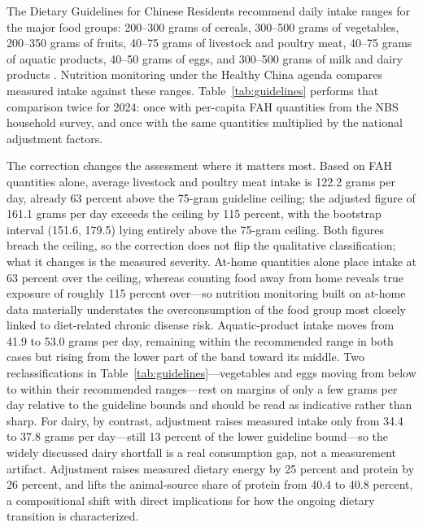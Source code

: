 \documentclass[preprint,12pt,authoryear]{elsarticle}
\begin{document}
The Dietary Guidelines for Chinese Residents recommend daily intake ranges for the major food groups: 200--300 grams of cereals, 300--500 grams of vegetables, 200--350 grams of fruits, 40--75 grams of livestock and poultry meat, 40--75 grams of aquatic products, 40--50 grams of eggs, and 300--500 grams of milk and dairy products \citep{CNS2022}. Nutrition monitoring under the Healthy China agenda compares measured intake against these ranges. Table~\ref{tab:guidelines} performs that comparison twice for 2024: once with per-capita FAH quantities from the NBS household survey, and once with the same quantities multiplied by the national adjustment factors.

The correction changes the assessment where it matters most. Based on FAH quantities alone, average livestock and poultry meat intake is 122.2 grams per day, already 63 percent above the 75-gram guideline ceiling; the adjusted figure of 161.1 grams per day exceeds the ceiling by 115 percent, with the bootstrap interval (151.6, 179.5) lying entirely above the 75-gram ceiling. Both figures breach the ceiling, so the correction does not flip the qualitative classification; what it changes is the measured severity. At-home quantities alone place intake at 63 percent over the ceiling, whereas counting food away from home reveals true exposure of roughly 115 percent over---so nutrition monitoring built on at-home data materially understates the overconsumption of the food group most closely linked to diet-related chronic disease risk. Aquatic-product intake moves from 41.9 to 53.0 grams per day, remaining within the recommended range in both cases but rising from the lower part of the band toward its middle. Two reclassifications in Table~\ref{tab:guidelines}---vegetables and eggs moving from below to within their recommended ranges---rest on margins of only a few grams per day relative to the guideline bounds and should be read as indicative rather than sharp. For dairy, by contrast, adjustment raises measured intake only from 34.4 to 37.8 grams per day---still 13 percent of the lower guideline bound---so the widely discussed dairy shortfall is a real consumption gap, not a measurement artifact. Adjustment raises measured dietary energy by 25 percent and protein by 26 percent, and lifts the animal-source share of protein from 40.4 to 40.8 percent, a compositional shift with direct implications for how the ongoing dietary transition is characterized.
\end{document}
